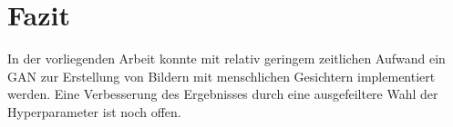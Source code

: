 \documentclass[twocolumn,10pt]{asme2ej}
\begin{document}
\section{Fazit}
In der vorliegenden Arbeit konnte mit relativ geringem zeitlichen Aufwand ein GAN zur Erstellung von Bildern mit menschlichen Gesichtern implementiert werden. Eine Verbesserung des Ergebnisses durch eine ausgefeiltere Wahl der Hyperparameter ist noch offen.




\end{document}
